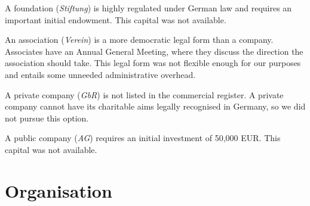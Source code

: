 \documentclass[output=guidelines,nonflat,smallfont,
draftmode
]{langsci/langscibook}
\newcommand{\othersolutions}[1]{
  \renewcommand{\tblslinecolour}{lsDarkGreenOne}
  \tblssy{more}{Other solutions}{\vspace*{-5mm}#1}
}
\renewcommand{\tblssy}[4][black!12]{%
  \renewcommand{\langscisymbol}{#2}\renewcommand{\tblsboxcolor}{#1}
  \begin{mdframed}[style=yellowexercise,frametitle={#3}]
    #4
  \end{mdframed}
}
\begin{document}
\othersolutions{
A foundation (\textit{Stiftung}) is highly regulated under German law and requires an important initial endowment. This capital was not available. 

An association (\textit{Verein}) is a more democratic legal form than a company. Associates have an Annual General Meeting, where they discuss the direction the association should take. This legal form was not flexible enough for our purposes and entails some unneeded administrative overhead. 

A private company (\textit{GbR}) is not listed in the  commercial register. A private company cannot have its charitable aims legally recognised in Germany, so we did not pursue this option. 

A public company (\textit{AG}) requires an initial investment of 50,000 EUR. This capital was not available. 
}
 

\section{Organisation}
\end{document}
